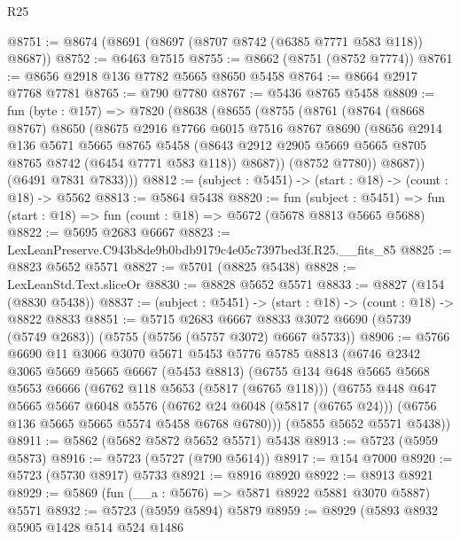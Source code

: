 \begin{lexlean}{R25}
\begin{coremodule}
@8751 := @8674 (@8691 (@8697 (@8707 @8742 (@6385 @7771 @583 @118)) @8687))
@8752 := @6463 @7515
@8755 := @8662 (@8751 (@8752 @7774))
@8761 := @8656 @2918 @136 @7782 @5665 @8650 @5458
@8764 := @8664 @2917 @7768 @7781
@8765 := @790 @7780
@8767 := @5436 @8765 @5458
@8809 := fun (byte : @157) =>
  @7820
    (@8638
      (@8655
        (@8755
          (@8761
            (@8764
              (@8668 @8767)
              @8650
              (@8675
                @2916
                @7766
                @6015
                @7516
                @8767
                @8690
                (@8656
                  @2914
                  @136
                  @5671
                  @5665
                  @8765
                  @5458
                  (@8643 @2912 @2905 @5669 @5665 @8705 @8765 @8742 (@6454 @7771 @583 @118))
                  @8687))
              (@8752 @7780))
            @8687))
        (@6491 @7831 @7833)))
@8812 := (subject : @5451) -> (start : @18) -> (count : @18) -> @5562
@8813 := @5864 @5438
@8820 := fun (subject : @5451) =>
  fun (start : @18) => fun (count : @18) => @5672 (@5678 @8813 @5665 @5688)
@8822 := @5695 @2683 @6667
@8823 := LexLeanPreserve.C943b8de9b0bdb9179c4e05c7397bed3f.R25.__fits_85
@8825 := @8823 @5652 @5571
@8827 := @5701 (@8825 @5438)
@8828 := LexLeanStd.Text.sliceOr
@8830 := @8828 @5652 @5571
@8833 := @8827 (@154 (@8830 @5438))
@8837 := (subject : @5451) -> (start : @18) -> (count : @18) -> @8822 @8833
@8851 := @5715
    @2683
    @6667
    @8833
    @3072
    @6690
    (@5739 (@5749 @2683))
    (@5755 (@5756 (@5757 @3072) @6667 @5733))
@8906 := @5766
    @6690
    @11
    @3066
    @3070
    @5671
    @5453
    @5776
    @5785
    @8813
    (@6746
      @2342
      @3065
      @5669
      @5665
      @6667
      (@5453 @8813)
      (@6755
        @134
        @648
        @5665
        @5668
        @5653
        @6666
        (@6762 @118 @5653 (@5817 (@6765 @118)))
        (@6755
          @448
          @647
          @5665
          @5667
          @6048
          @5576
          (@6762 @24 @6048 (@5817 (@6765 @24)))
          (@6756 @136 @5665 @5665 @5574 @5458 @6768 @6780)))
      (@5855 @5652 @5571 @5438))
@8911 := @5862 (@5682 @5872 @5652 @5571) @5438
@8913 := @5723 (@5959 @5873)
@8916 := @5723 (@5727 (@790 @5614))
@8917 := @154 @7000
@8920 := @5723 (@5730 @8917) @5733
@8921 := @8916 @8920
@8922 := @8913 @8921
@8929 := @5869 (fun (__a : @5676) => @5871 @8922 @5881 @3070 @5887) @5571
@8932 := @5723 (@5959 @5894) @5879
@8959 := @8929
    (@5893
      @8932
      @5905
      @1428
      @514
      @524
      @1486

\end{coremodule}
\end{lexlean}
